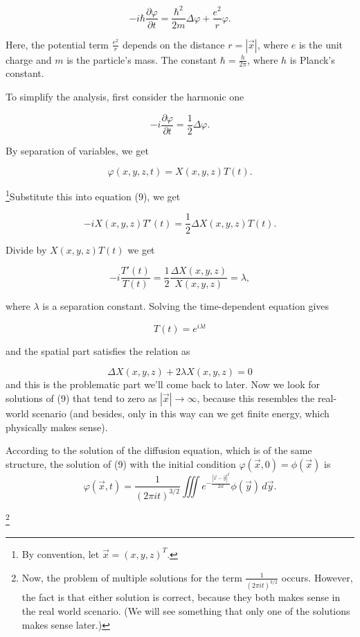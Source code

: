 \documentclass[a4paper,12pt]{report}
\begin{document}
\[
-i\hbar \frac{\partial \varphi}{\partial t} = \frac{\hbar^2}{2m} \Delta \varphi + \frac{e^2}{r} \varphi. \tag{8}
\]

Here, the potential term $\frac{e^2}{r}$ depends on the distance $r = |\vec{x}|$, where $e$ is the unit charge and $m$ is the particle's mass. The constant $\hbar = \frac{h}{2\pi}$, where $h$ is Planck's constant.

To simplify the analysis, first consider the harmonic one  

\[
-i \frac{\partial \varphi}{\partial t} = \frac{1}{2} \Delta \varphi. \tag{9}
\]

By separation of variables, we get

\[
\varphi(x, y, z, t) = X(x, y, z)T(t).
\]

\footnote{By convention, let \(\vec{x} = (x, y, z)^T\).}Substitute this into equation (9), we get

\[
-i X(x, y, z) T'(t) = \frac{1}{2} \Delta X(x, y, z) T(t).
\]

Divide by $X(x, y, z) T(t)$ we get

\[
-i \frac{T'(t)}{T(t)} = \frac{1}{2} \frac{\Delta X(x ,y, z)}{X(x, y, z)} = \lambda,
\]

where $\lambda$ is a separation constant. Solving the time-dependent equation gives

\[
T(t) = e^{i\lambda t}
\]

and the spatial part satisfies the relation as

\[
\Delta X(x, y, z) + 2\lambda X(x, y, z) = 0
\]
and this is the problematic part we'll come back to later. 
Now we look for solutions of (9) that tend to zero as $|\vec{x}| \to \infty$, because this resembles the real-world scenario (and besides, only in this way can we get finite energy, which physically makes sense).

According to the solution of the diffusion equation, which is of the same structure, the solution of (9) with the initial condition $\varphi(\vec{x}, 0) = \phi(\vec{x})$ is
\begin{equation}
\varphi(\vec{x}, t) = \frac{1}{(2\pi it)^{3/2}} \iiint e^{ -\frac{|\vec{x} - \vec{y}|^2}{2it} } \phi(\vec{y}) \, d\vec{y}. \tag{10}
\end{equation}

\footnote{Now, the problem of multiple solutions for the term \(\frac{1}{(2\pi it)^{3/2}}\) occurs. However, the fact is that either solution is correct, because they both makes sense in the real world scenario. (We will see something that only one of the solutions makes sense later.)}
\end{document}
